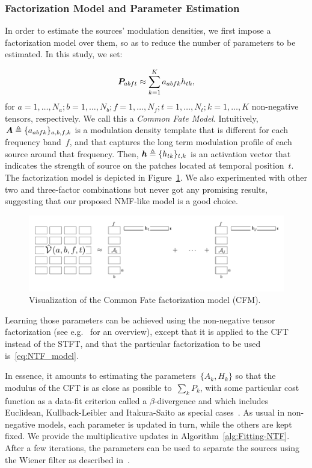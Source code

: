 \subsubsection{Factorization Model and Parameter Estimation}
\label{sub:NTF}

In order to estimate the sources' modulation densities, we first impose
a factorization model over them, so as to reduce the number of parameters
to be estimated. In this study, we set:

\begin{equation}
{\bm{P}}_{abft} \approx \sum_{k=1}^{K}a_{abfk}h_{tk},\label{eq:NTF_model}
\end{equation}
for  $a=1,\ldots,N_a;b=1,\ldots,N_b;f=1,\ldots,N_f;t=1,\ldots,N_t;k=1,\ldots,K$
non-negative tensors, respectively. We call this a \emph{Common Fate
Model}. Intuitively, ${\bm{A}} \triangleq \{a_{abfk}\}_{a,b,f,k}$ is a modulation density template that
is different for each frequency band~$f$, and that captures the
long term modulation profile of each source around that frequency.
Then, ${\bm{h}} \triangleq \{h_{tk}\}_{t,k}$ is an activation vector that indicates the strength
of source on the patches located at temporal position~$t$.
The factorization model is depicted in Figure~\ref{fig:cfm}.
We also experimented with other two and three-factor combinations but never got any promising results, suggesting that our proposed NMF-like model is a good choice.

\begin{figure}[!htbp]
\centering
\includegraphics[width=0.9\columnwidth]{Chapters/06_Separation_Unknown/figures/cfm.pdf}
\caption{Visualization of the Common Fate factorization model (CFM).}
\label{fig:cfm}
\end{figure}

Learning those parameters can be achieved using the non-negative
tensor factorization (see e.g.~\cite{cichoki09,ozerov12,smaragdis14}
for an overview), except that it is applied to the CFT instead of the STFT,
and that the particular factorization to be used is~\eqref{eq:NTF_model}.

In essence, it amounts to estimating the parameters~$\{ A_{k},H_{k}\} $
so that the modulus of the CFT is
as close as possible to~$\sum_{k}P_{k}$, with some particular
cost function as a data-fit criterion called a $\beta$-divergence
and which includes Euclidean, Kullback-Leibler and Itakura-Saito as
special cases~\cite{fitzgerald08a}. As usual in non-negative models,
each parameter is updated in turn, while the others are kept fixed.
We provide the multiplicative updates in Algorithm~\ref{alg:Fitting-NTF}.
After a few iterations, the parameters can be used to separate the sources using the Wiener filter as described in~\cite{liutkus15}.


